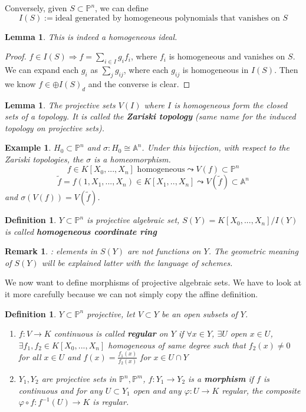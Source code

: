 \documentclass[11pt]{article}
\newtheorem{lemma}[thm]{Lemma}
\newtheorem{dfn}[thm]{Definition}
\newtheorem{rmk}[thm]{Remark}
\newtheorem{ex}[thm]{Example}
\newcommand{\affn}{\mathbb A}
\newcommand{\proj}{\mathbb P}
\newcommand{\Lrta}{\Longrightarrow}
\newcommand{\lrta}{\longrightarrow}
\begin{document}
Conversely, given $S\subset \proj^n$, we can define 
$$
I(S):=\text{ideal generated by homogeneous polynomials that vanishes on $S$}
$$
\begin{lemma}
This is indeed a homogeneous ideal. 
\end{lemma}
\begin{proof}
$f\in I(S)\Lrta f=\sum_{i\in I}g_i f_i$, where $f_i$ is homogeneous and vanishes on $S$. We can expand each $g_i$ as $\sum_j g_{ij}$, where each $g_{ij}$ is homogeneous in $I(S)$. Then we know $f\in \oplus I(S)_d$ and the converse is clear.
\end{proof}
\begin{lemma}
The projective sets $V(I)$ where $I$ is homogeneous form the closed sets of a topology. It is called the \textbf{Zariski topology} (same name for the induced topology on projective sets).
\end{lemma}
\begin{ex}
$H_0\subset \proj^n$ and $\sigma: H_0\cong \affn^n$. Under this bijection, with respect to the Zariski topologies, the  $\sigma $ is a homeomorphism.
$$
f\in K[X_0,...,X_n]\text{ homogeneous} \leadsto V(f)\subset \proj^n
$$
$$
\tilde{f}=f(1,X_1,...,X_n)\in K[X_1,..,X_n]\leadsto V(\tilde{f})\subset \affn^n
$$
and $\sigma(V(f))=V(\tilde{f})$.
\end{ex}
\begin{dfn}
$Y\subset \proj^n$ is  projective algebraic set,  $S(Y)=K[X_0,...,X_n]/I(Y)$ is called  \textbf{homogeneous coordinate ring}
\end{dfn}
\begin{rmk}: elements in $S(Y)$ are not functions on $Y$. The geometric meaning of $S(Y)$ will be explained latter with the language of schemes.
\end{rmk}
We now want to define morphisms of  projective algebraic sets. We have to look at it more carefully because we can not simply copy the affine definition.
\begin{dfn}
$Y\subset \proj^n$ projective, let $V\subset Y $ be an open subsets of $Y$.
\begin{enumerate}[label=(\arabic*)]
\item $f: V\lrta K$ continuous is called \textbf{regular} on $Y$ if $\forall x\in Y$, $\exists U$ open $x\in U$, $\exists f_1,f_2\in K[X_0,...,X_n]$ homogeneous of same degree such that $f_2(x)\neq 0$ for all $x\in U$ and $f(x)=\frac{f_1(x)}{f_2(x)}$ for $x\in U\cap Y$
\item $Y_1,Y_2$ are projective sets in $\proj^n,\proj^m$, $f: Y_1\lrta Y_2$ is a \textbf{morphism} if $f$ is continuous and for any $U\subset Y_1$ open and any $\varphi:U\lrta K$ regular, the composite $\varphi\circ f: f^{-1}(U)\lrta K$ is regular.
\end{enumerate}
\end{dfn}
\end{document}

